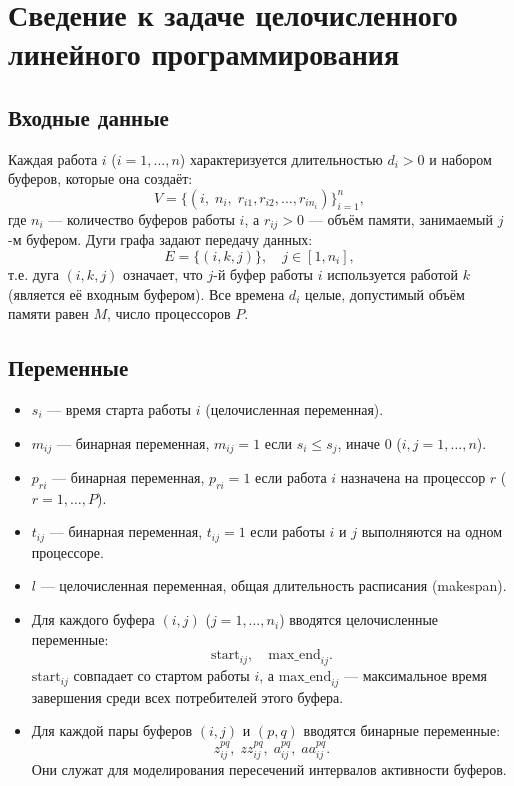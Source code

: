 \section{Сведение к задаче целочисленного линейного программирования}

\subsection*{Входные данные}
Каждая работа $i$ ($i=1,\dots,n$) характеризуется длительностью $d_i>0$ и набором буферов, которые она создаёт:
\[
V = \bigl\{(i,\; n_i,\; r_{i1}, r_{i2}, \dots, r_{i n_i})\bigr\}_{i=1}^{n},
\]
где $n_i$ — количество буферов работы $i$, а $r_{ij}>0$ — объём памяти, занимаемый $j$-м буфером.  
Дуги графа задают передачу данных:
\[
E = \{(i, k, j)\},\quad j\in[1,n_i],
\]
т.е. дуга $(i,k,j)$ означает, что $j$-й буфер работы $i$ используется работой $k$ (является её входным буфером).  
Все времена $d_i$ целые, допустимый объём памяти равен $M$, число процессоров $P$.

\subsection*{Переменные}

\begin{itemize}
	\item $s_i$ — время старта работы $i$ (целочисленная переменная).
	\item $m_{ij}$ — бинарная переменная, $m_{ij}=1$ если $s_i \le s_j$, иначе $0$ ($i,j=1,\dots,n$).
	\item $p_{ri}$ — бинарная переменная, $p_{ri}=1$ если работа $i$ назначена на процессор $r$ ($r=1,\dots,P$).
	\item $t_{ij}$ — бинарная переменная, $t_{ij}=1$ если работы $i$ и $j$ выполняются на одном процессоре.
	\item $l$ — целочисленная переменная, общая длительность расписания (makespan).
	\item Для каждого буфера $(i,j)$ ($j=1,\dots,n_i$) вводятся целочисленные переменные:
	\[
	\text{start}_{ij},\quad \text{max\_end}_{ij}.
	\]
	$\text{start}_{ij}$ совпадает со стартом работы $i$, а $\text{max\_end}_{ij}$ — максимальное время завершения среди всех потребителей этого буфера.
	\item Для каждой пары буферов $(i,j)$ и $(p,q)$ вводятся бинарные переменные:
	\[
	z_{ij}^{pq},\; zz_{ij}^{pq},\; a_{ij}^{pq},\; aa_{ij}^{pq}.
	\]
	Они служат для моделирования пересечений интервалов активности буферов.
\end{itemize}

